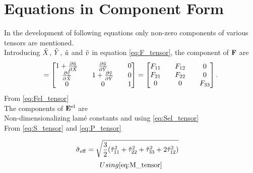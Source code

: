 \chapter{Equations in Component Form}
In the development of following equations only non-zero components of various tensors are mentioned.\\
Introducing $\tilde{X}$, $\tilde{Y}$, $\tilde{u}$ and $\tilde{v}$ in equation \ref{eq:F_tensor}, the component of $\mathbf{F}$ are 
\begin{align}
[\F] = 
\begin{bmatrix}
       1 + \pdiff{\tu}{\tX} && \pdiff{\tu}{\tY} && 0 \\
       \pdiff{\tv}{\tX} && 1 + \pdiff{\tv}{\tY} && 0 \\
       0 && 0 && 1
\end{bmatrix} = \begin{bmatrix}
    F_{11} && F_{12}  && 0 \\
    F_{21} && F_{22}  && 0 \\
    0 && 0 && F_{33}
\end{bmatrix}.
\end{align}
From \ref{eq:Fel_tensor}
\begin{subequations}

\end{subequations}
The components of $\mathbf{E}^{\rm{el}}$ are
\begin{subequations}

\end{subequations}
Non-dimensionalizing lam\'{e} constants and using \ref{eq:Sel_tensor}
\begin{subequations}

\end{subequations}
From \ref{eq:S_tensor} and \ref{eq:P_tensor}
\begin{subequations}

\end{subequations}
\begin{subequations}

\end{subequations}
\begin{subequations}

\end{subequations}
\begin{subequations}

\end{subequations}

\begin{align}
    \tilde{\sigma}_{\rm{eff}} &= \sqrt{\frac{3}{2}(\tilde{\tau}_{11}^2 + \tilde{\tau}_{22}^2 + \tilde{\tau}_{33}^2 + 2\tilde{\tau}_{12}^2) }
\end{align}
\begin{subequations}
Using \ref{eq:M_tensor}

\end{subequations}
{\color{red}{These equations need editing if Fpdot\_mat.tex is changed}}
\begin{subequations}

\end{subequations}


